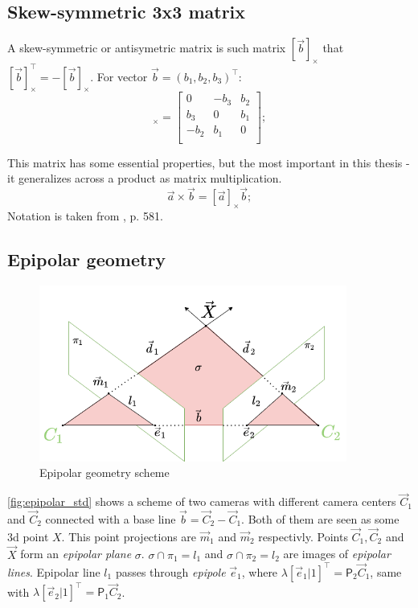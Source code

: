 \subsection{Skew-symmetric 3x3 matrix}
A skew-symmetric or antisymetric matrix is such matrix $[\vec{b}]_{\times}$ that $[\vec{b}]_{\times}^\top = -[\vec{b}]_{\times}$. 
For vector $\vec{b} = (b_1, b_2, b_3)^\top$:
\begin{equation}
    [\vec{b}]_{\times} = \begin{bmatrix}
        0 & -b_3 & b_2 \\ 
        b_3 & 0 & b_1 \\ 
        -b_2 & b_1 & 0 \\ 
    \end{bmatrix};
\end{equation}

This matrix has some essential properties, but the most important in this thesis - it generalizes across a product as matrix multiplication.
\begin{equation}
    \vec{a} \times \vec{b} = [\vec{a}]_{\times} \vec{b};
\end{equation}
Notation is taken from \cite{hartley_zisserman_2004}, p. 581.
\subsection{Epipolar geometry}
\label{epipolar_geometry}
\begin{figure}[h]
    \centering
    \includegraphics[width=0.9\textwidth]{graphics/epipolar.png}
    \caption{Epipolar geometry scheme}
    \label{fig:epipolar_std}
\end{figure}

\autoref{fig:epipolar_std} shows a scheme of two cameras with different camera centers $\vec{C}_1$ and $\vec{C}_2$ connected with a base line $\vec{b} = \vec{C}_2 - \vec{C}_1$. 
Both of them are seen as some 3d point $X$. 
This point projections are $\vec{m}_1$ and $\vec{m}_2$ respectivly. 
Points $\vec{C}_1, \vec{C}_2$ and $\vec{X}$ form an \textit{epipolar plane} $\sigma$.
$\sigma \cap \pi_1 = l_1$ and $\sigma \cap \pi_2 = l_2$ are images of \textit{epipolar lines}. 
Epipolar line $l_1$ passes through \textit{epipole} $\vec{e}_1$, where $\lambda [\vec{e}_1 | 1]^\top = \pmb{\mathsf{P}}_2 \vec{C}_1$, same with $\lambda [\vec{e}_2 | 1]^\top = \pmb{\mathsf{P}}_1 \vec{C}_2$.

